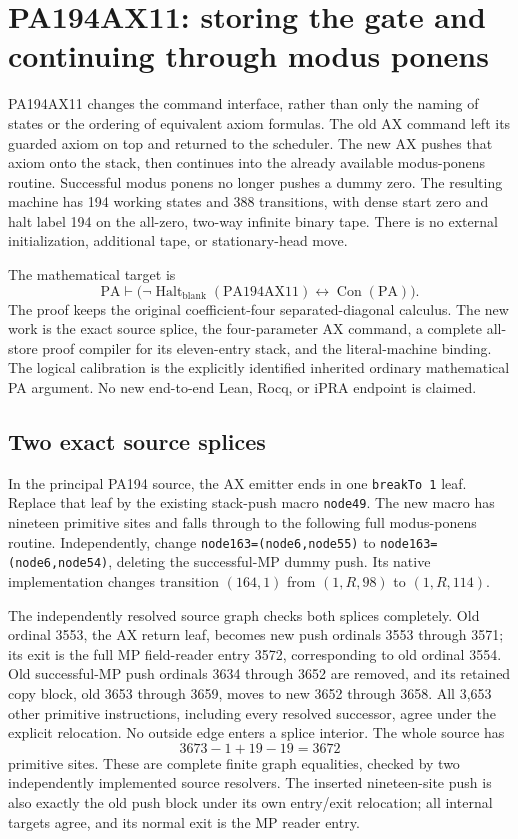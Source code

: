 \section{PA194AX11: storing the gate and continuing through modus ponens}
\label{sec:ax11}

PA194AX11 changes the command interface, rather than only the naming of
states or the ordering of equivalent axiom formulas. The old AX command
left its guarded axiom on top and returned to the scheduler. The new AX
pushes that axiom onto the stack, then continues into the already available
modus-ponens routine. Successful modus ponens no longer pushes a dummy
zero. The resulting machine has 194 working states and 388 transitions,
with dense start zero and halt label 194 on the all-zero, two-way infinite
binary tape. There is no external initialization, additional tape, or
stationary-head move.

The mathematical target is
\[
 \mathrm{PA}\vdash
 \bigl(\neg\operatorname{Halt}_{\mathrm{blank}}(\mathrm{PA194AX11})
                \leftrightarrow\operatorname{Con}(\mathrm{PA})\bigr).
 \tag{AX11}
\]
The proof keeps the original coefficient-four separated-diagonal calculus.
The new work is the exact source splice, the four-parameter AX command,
a complete all-store proof compiler for its eleven-entry stack, and the
literal-machine binding. The logical calibration is the explicitly
identified inherited ordinary mathematical PA argument. No new
end-to-end Lean, Rocq, or iPRA endpoint is claimed.

\subsection{Two exact source splices}

In the principal PA194 source, the AX emitter ends in one
\texttt{breakTo 1} leaf. Replace that leaf by the existing stack-push
macro \texttt{node49}. The new macro has nineteen primitive sites and
falls through to the following full modus-ponens routine. Independently,
change \texttt{node163=(node6,node55)} to
\texttt{node163=(node6,node54)}, deleting the successful-MP dummy push.
Its native implementation changes transition $(164,1)$ from
$(1,R,98)$ to $(1,R,114)$.

The independently resolved source graph checks both splices completely.
Old ordinal 3553, the AX return leaf, becomes new push ordinals
3553 through 3571; its exit is the full MP field-reader entry 3572,
corresponding to old ordinal 3554. Old successful-MP push ordinals
3634 through 3652 are removed, and its retained copy block, old
3653 through 3659, moves to new 3652 through 3658. All 3,653 other
primitive instructions, including every resolved successor, agree under
the explicit relocation. No outside edge enters a splice interior.
The whole source has
\[
                 3673-1+19-19=3672
\]
primitive sites. These are complete finite graph equalities, checked by
two independently implemented source resolvers. The inserted nineteen-site
push is also exactly the old push block under its own entry/exit relocation;
all internal targets agree, and its normal exit is the MP reader entry.

